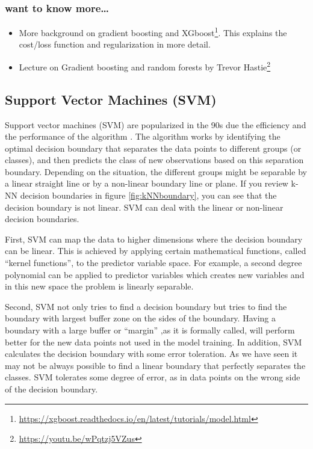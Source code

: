 \documentclass[12pt,]{krantz}
\providecommand{\tightlist}{%
  \setlength{\itemsep}{0pt}\setlength{\parskip}{0pt}}
\renewcommand{\href}[2]{#2\footnote{\url{#1}}}
\begin{document}
\hypertarget{want-to-know-more-1}{%
\subsubsection{want to know more\ldots{}}\label{want-to-know-more-1}}

\begin{itemize}
\tightlist
\item
  \href{https://xgboost.readthedocs.io/en/latest/tutorials/model.html}{More background on gradient boosting and XGboost}. This explains the cost/loss function and regularization in more detail.
\item
  \href{https://youtu.be/wPqtzj5VZus}{Lecture on Gradient boosting and random forests by Trevor Hastie}
\end{itemize}

\hypertarget{support-vector-machines-svm}{%
\subsection{Support Vector Machines (SVM)}\label{support-vector-machines-svm}}

Support vector machines (SVM) are popularized in the 90s due the efficiency and the performance of the algorithm \citep{boser1992svm}. The algorithm works by identifying the optimal decision boundary that separates the data points to different groups (or classes), and then predicts the class of new observations based on this separation boundary. Depending on the situation, the different groups might be separable by a linear straight line or by a non-linear boundary line or plane. If you review k-NN decision boundaries in figure \ref{fig:kNNboundary}, you can see that the decision boundary is not linear. SVM can deal with the linear or non-linear decision boundaries.

First, SVM can map the data to higher dimensions where the decision boundary can be linear. This is achieved by applying certain mathematical functions, called ``kernel functions'', to the predictor variable space. For example, a second degree polynomial can be applied to predictor variables which creates new variables and in this new space the problem is linearly separable.

Second, SVM not only tries to find a decision boundary but tries to find the boundary with largest buffer zone on the sides of the boundary. Having a boundary with a large buffer or ``margin'' ,as it is formally called, will perform better for the new data points not used in the model training. In addition, SVM calculates the decision boundary with some error toleration. As we have seen it may not be always possible to find a linear boundary that perfectly separates the classes. SVM tolerates some degree of error, as in data points on the wrong side of the decision boundary.
\end{document}

